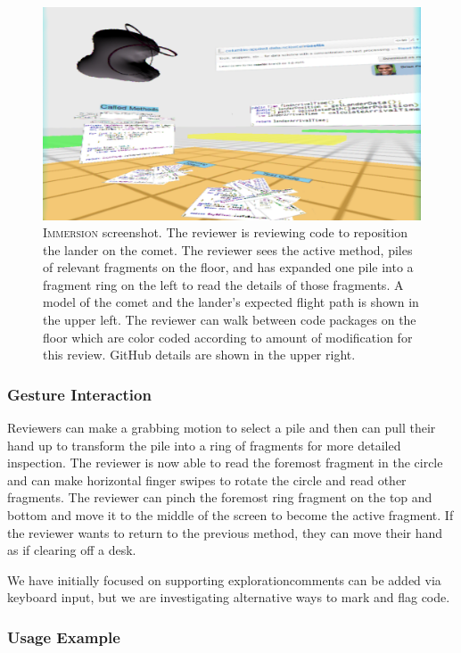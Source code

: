 \documentclass[conference]{IEEEtran}
\begin{document}
\begin{figure}[ht]
\centering
\includegraphics[width=\linewidth]{figures/immersion/immersion_unwarped}
\caption{\textsc{Immersion} screenshot. The reviewer is reviewing code to reposition the lander on the comet. The reviewer sees the active method, piles of relevant fragments on the floor, and has expanded one pile into a fragment ring on the left to read the details of those fragments. A model of the comet and the lander's expected flight path is shown in the upper left. The reviewer can walk between code packages on the floor which are color coded according to amount of modification for this review. GitHub details are shown in the upper right. 
 \label{fig:Immersion}}
\end{figure}

\subsubsection{Gesture Interaction}

Reviewers can make a grabbing motion to select a pile and then can pull their hand up to transform the pile into a ring of fragments for more detailed inspection.
The reviewer is now able to read the foremost fragment in the circle and can make horizontal finger swipes to rotate the circle and read other fragments. 
The reviewer can pinch the foremost ring fragment on the top and bottom and move it to the middle of the screen to become the active fragment.
If the reviewer wants to return to the previous method, they can move their hand as if clearing off a desk.

We have initially focused on supporting exploration\textemdash comments can be added via keyboard input, but we are investigating alternative ways to mark and flag code.


\subsubsection{Usage Example}
\end{document}
